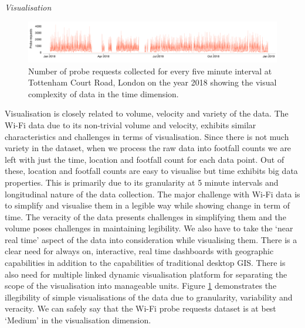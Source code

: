 
\vspace{1.5em}\noindent\textit{Visualisation}\vspace{0.5em}

\begin{figure}
  \includegraphics{images/data-visualisation-challenge.png}
  \caption{Number of probe requests collected for every five minute interval at Tottenham Court Road, London on the year 2018 showing the visual complexity of data in the time dimension.}
  \label{figure:toolkit:visualisation}
\end{figure}

Visualisation is closely related to volume, velocity and variety of the data.
The Wi-Fi data due to its non-trivial volume and velocity, exhibits similar characteristics and challenges in terms of visualisation.
Since there is not much variety in the dataset, when we process the raw data into footfall counts we are left with just the time, location and footfall count for each data point.
Out of these, location and footfall counts are easy to visualise but time exhibits big data properties.
This is primarily due to its granularity at 5 minute intervals and longitudinal nature of the data collection.
The major challenge with Wi-Fi data is to simplify and visualise them in a legible way while showing change in term of time.
The veracity of the data presents challenges in simplifying them and the volume poses challenges in maintaining legibility.
We also have to take the `near real time' aspect of the data into consideration while visualising them.
There is a clear need for always on, interactive, real time dashboards with geographic capabilities in addition to the capabilities of traditional desktop GIS.
There is also need for multiple linked dynamic visualisation platform for separating the scope of the visualisation into manageable units.
Figure \ref{figure:toolkit:visualisation} demonstrates the illegibility of simple visualisations of the data due to granularity, variability and veracity.
We can safely say that the Wi-Fi probe requests dataset is at best `Medium' in the visualisation dimension.

